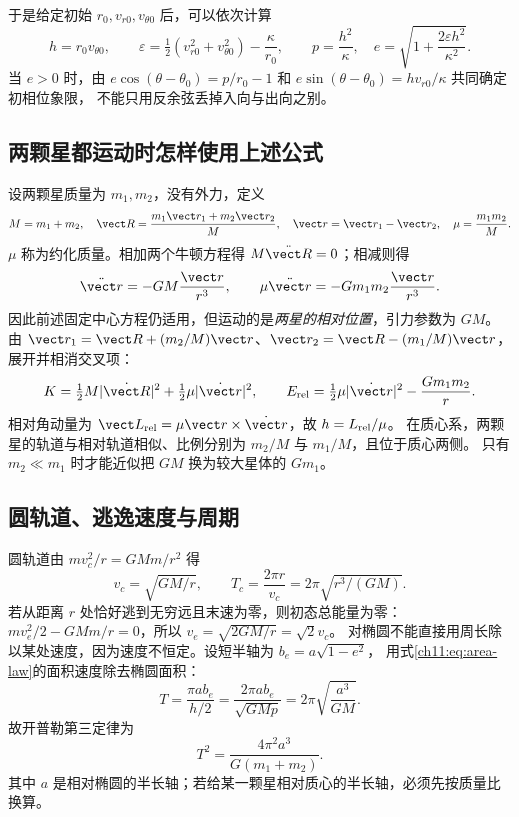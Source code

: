 于是给定初始 $r_0,v_{r0},v_{\theta0}$ 后，可以依次计算
\[
 h=r_0v_{\theta0},\qquad
 \varepsilon=\tfrac12(v_{r0}^2+v_{\theta0}^2)-\frac\kappa{r_0},\qquad
 p=\frac{h^2}{\kappa},\quad e=\sqrt{1+\frac{2\varepsilon h^2}{\kappa^2}}.
\]
当 $e>0$ 时，由
$e\cos(\theta-\theta_0)=p/r_0-1$ 和
$e\sin(\theta-\theta_0)=hv_{r0}/\kappa$ 共同确定初相位象限，
不能只用反余弦丢掉入向与出向之别。

\subsection{两颗星都运动时怎样使用上述公式}
设两颗星质量为 $m_1,m_2$，没有外力，定义
\[
 M=m_1+m_2,\quad
 \vect R=\frac{m_1\vect r_1+m_2\vect r_2}{M},\quad
 \vect r=\vect r_1-\vect r_2,\quad \mu=\frac{m_1m_2}{M}.
\]
$\mu$ 称为约化质量。相加两个牛顿方程得 $M\ddot{\vect R}=0$；相减则得
\[
 \ddot{\vect r}=-GM\frac{\vect r}{r^3},\qquad
 \mu\ddot{\vect r}=-Gm_1m_2\frac{\vect r}{r^3}.
\]
因此前述固定中心方程仍适用，但运动的是\emph{两星的相对位置}，引力参数为 $GM$。
由 $\vect r_1=\vect R+(m_2/M)\vect r$、$\vect r_2=\vect R-(m_1/M)\vect r$，展开并相消交叉项：
\[
 K=\tfrac12M|\dot{\vect R}|^2+\tfrac12\mu|\dot{\vect r}|^2,\qquad
 E_{\rm rel}=\tfrac12\mu|\dot{\vect r}|^2-\frac{Gm_1m_2}{r}.
\]
相对角动量为 $\vect L_{\rm rel}=\mu\vect r\times\dot{\vect r}$，故 $h=L_{\rm rel}/\mu$。
在质心系，两颗星的轨道与相对轨道相似、比例分别为 $m_2/M$ 与 $m_1/M$，且位于质心两侧。
只有 $m_2\ll m_1$ 时才能近似把 $GM$ 换为较大星体的 $Gm_1$。

\subsection{圆轨道、逃逸速度与周期}
圆轨道由 $mv_c^2/r=GMm/r^2$ 得
\[
 v_c=\sqrt{GM/r},\qquad T_c=\frac{2\pi r}{v_c}=2\pi\sqrt{r^3/(GM)}.
\]
若从距离 $r$ 处恰好逃到无穷远且末速为零，则初态总能量为零：
$mv_e^2/2-GMm/r=0$，所以 $v_e=\sqrt{2GM/r}=\sqrt2v_c$。
对椭圆不能直接用周长除以某处速度，因为速度不恒定。设短半轴为 $b_e=a\sqrt{1-e^2}$，
用式\eqref{ch11:eq:area-law}的面积速度除去椭圆面积：
\[
 T=\frac{\pi ab_e}{h/2}=\frac{2\pi ab_e}{\sqrt{GMp}}
 =2\pi\sqrt{\frac{a^3}{GM}}.
\]
故开普勒第三定律为
\begin{equation}\label{ch11:eq:third-law}
 \boxed{T^2=\frac{4\pi^2a^3}{G(m_1+m_2)}}.
\end{equation}
其中 $a$ 是相对椭圆的半长轴；若给某一颗星相对质心的半长轴，必须先按质量比换算。

